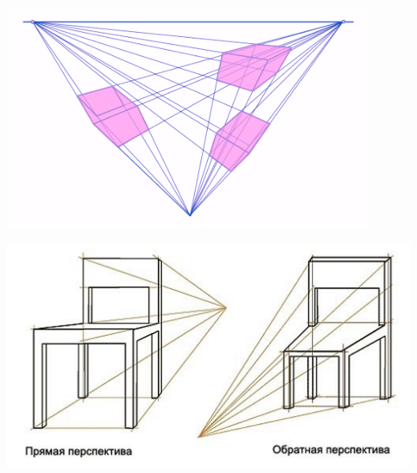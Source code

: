 \documentclass[10pt]{beamer}
\begin{document}
   
    
    {
    	\centering
    	\includegraphics[width=0.9\textwidth]{8a8420d9-84c8-5ef2-a90d-76981bc7f72d.png}
    }
    
    {
    	
    	\centering
    	\includegraphics[width=\textwidth]{5.jpg}
    }
    
\end{document}
